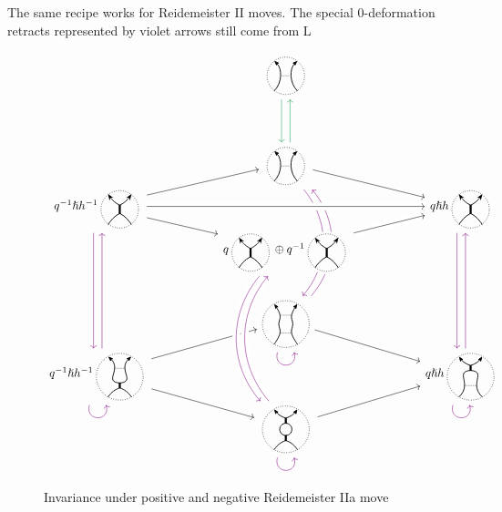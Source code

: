 \documentclass{article}
\theoremstyle{plain} %
\theoremstyle{definition} %
\theoremstyle{remark} %
\begin{document}
The same recipe works for Reidemeister II moves. The special 0-deformation retracts represented by violet arrows still come from L

\begin{figure}
	\centering
	\[\label{r2asdr}
	\begin{tikzcd}[row sep=-0.1cm, column sep=2cm]
		&
		\scalebox{0.7}{\ThinEdge{}{}{}{}}
		\arrow[d, color=ForestGreen, shift right=1.5]
		&
		\\[4em]&
		\scalebox{0.7}{\ThinEdge{}{}{}{}}
		\arrow[dr]
		\arrow[ddd, bend left=40, color=violet, shift right=1.5, dash pattern=on 40pt off 35pt]
		\arrow[leftarrow, ddd, bend left=40, color=violet, shift left=1.5, dash pattern=on 39.5pt off 37pt]
		\arrow[u, color=ForestGreen, shift right=1.5]
		&
		\\
		q^{-1}\hslash h^{-1}\scalebox{0.7}{\ThickEdge{}{}{}{}} 
		\arrow[dr]
		\arrow[ur]
		\arrow[ddd, color=violet, shift right=1.5]
		&
		&
		q\hslash h\scalebox{0.7}{\ThickEdge{}{}{}{}}
		\arrow[ddd, color=violet, shift right=1.5]
		\\
		& 
		q \scalebox{0.7}{\ThickEdge{}{}{}{}}\oplus q^{-1} \scalebox{0.7}{\ThickEdge{}{}{}{}}
		\arrow[ur, crossing over] 
		&
		\\[2em]
		& 
		\scalebox{0.7}{\ThinThin{}{}{}{}{}}
		\arrow[loop right, distance=1.5em, in=-75, out=-105, color=violet]
		\arrow[dr]
		&
		\\
		q^{-1}\hslash h^{-1}\scalebox{0.7}{\ThinThick{}{}{}{}{}} 
		\arrow[loop right, distance=1.5em, in=-75, out=-105, color=violet]
		\arrow[ur]
		\arrow[dr]
		\arrow[uuu, color=violet, shift right=1.5]
		&& 
		q\hslash h\scalebox{0.7}{\ThickThin{}{}{}{}{}}
		\arrow[uuu, color=violet, shift right=1.5]
		\arrow[loop right, distance=1.5em, in=-75, out=-105, color=violet]
		\\
		& 
		\scalebox{0.7}{\Bigon{}{}{}{}{}} 
		\arrow[ur]
		\arrow[loop right, distance=1.5em, in=-75, out=-105, color=violet] 
		&
		\arrow[ddd, from=4-2, to=7-2, bend right=40, crossing over, color=violet, shift right=1.5] 
		\arrow[uuu, from=7-2, to=4-2, bend left=40, crossing over, color=violet, shift right=1.5] 
		\arrow[ur, from=4-2, to=3-3, crossing over] 
		\arrow[rr, from=3-1, to=3-3, crossing over] 
	\end{tikzcd}
	\]
		\caption{Invariance under positive and negative Reidemeister IIa move}
\end{figure}
\end{document}
